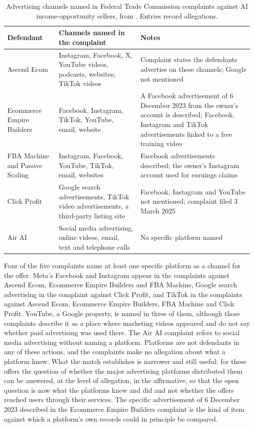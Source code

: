 \documentclass[12pt, a4paper]{article}
\begin{document}
\begin{table}[h]
\centering
\small
\begin{tabular}{@{}p{}p{}p{}@{}}
\toprule
Defendant & Channels named in the complaint & Notes \\
\midrule
Ascend Ecom & Instagram, Facebook, X, YouTube videos, podcasts, websites; TikTok videos & Complaint states the defendants advertise on these channels; Google not mentioned \\
Ecommerce Empire Builders & Facebook, Instagram, TikTok, YouTube, email, website & A Facebook advertisement of 6 December 2023 from the owner's account is described; Facebook, Instagram and TikTok advertisements linked to a free training video \\
FBA Machine and Passive Scaling & Instagram, Facebook, YouTube, TikTok, email, websites & Facebook advertisements described; the owner's Instagram account used for earnings claims \\
Click Profit & Google search advertisements, TikTok video advertisements, a third-party listing site & Facebook, Instagram and YouTube not mentioned; complaint filed 3 March 2025 \\
Air AI & Social media advertising, online videos, email, text and telephone calls & No specific platform named \\
\bottomrule
\end{tabular}
\caption{Advertising channels named in Federal Trade Commission complaints against AI income-opportunity sellers, from \citet{FTCAscendComplaint,FTCEEBComplaint,FTCFBAComplaint,FTCClickProfitComplaint,FTCAirAIComplaint}. Entries record allegations.}
\label{tab:channels}
\end{table}

Four of the five complaints name at least one specific platform as a channel for the offer. Meta's Facebook and Instagram appear in the complaints against Ascend Ecom, Ecommerce Empire Builders and FBA Machine, Google search advertising in the complaint against Click Profit, and TikTok in the complaints against Ascend Ecom, Ecommerce Empire Builders, FBA Machine and Click Profit. YouTube, a Google property, is named in three of them, although those complaints describe it as a place where marketing videos appeared and do not say whether paid advertising was used there. The Air AI complaint refers to social media advertising without naming a platform. Platforms are not defendants in any of these actions, and the complaints make no allegation about what a platform knew. What the match establishes is narrower and still useful: for these offers the question of whether the major advertising platforms distributed them can be answered, at the level of allegation, in the affirmative, so that the open question is now what the platforms knew and did and not whether the offers reached users through their services. The specific advertisement of 6 December 2023 described in the Ecommerce Empire Builders complaint is the kind of item against which a platform's own records could in principle be compared.
\end{document}
